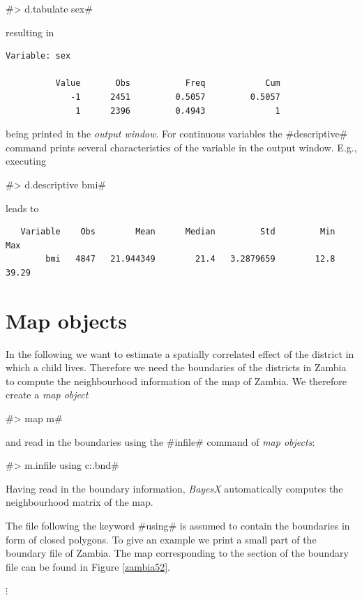 \documentclass{article}
\begin{document}
#> d.tabulate sex#

resulting in

\begin{verbatim}
Variable: sex

          Value       Obs           Freq            Cum
             -1      2451         0.5057         0.5057
              1      2396         0.4943              1
\end{verbatim}

being printed in the {\it output window}. For continuous variables
the #descriptive# command prints several characteristics of the
variable in the {output window}. E.g., executing

#> d.descriptive bmi#

leads to

\begin{verbatim}
   Variable    Obs        Mean      Median         Std         Min         Max
        bmi   4847   21.944349        21.4   3.2879659        12.8       39.29
\end{verbatim}

\section{Map objects}\label{maps}

In the following we want to estimate a spatially correlated effect
of the district in which a child lives. Therefore we need the
boundaries of the districts in Zambia to compute the neighbourhood
information of the map of Zambia. We therefore create a {\it map
object}

#> map m#

and read in the boundaries using the #infile# command of {\it map
objects}:

#> m.infile using c:\data\zambia.bnd#

Having read in the boundary information, {\it BayesX}
automatically computes the neighbourhood matrix of the map.

The file following the keyword #using# is assumed to contain the
boundaries in form of closed polygons. To give an example we print
a small part of the boundary file of Zambia. The map corresponding
to the section of the boundary file can be found in Figure
\ref{zambia52}.

\footnotesize

\hspace{1cm}  $\vdots$
\end{document}
